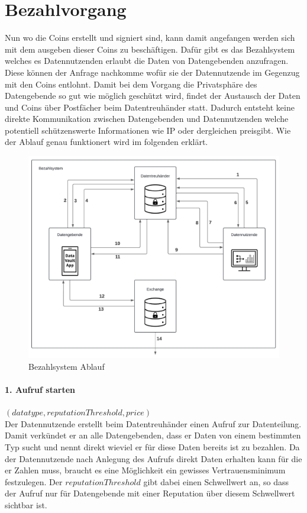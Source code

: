 \documentclass[11pt,a4paper]{scrreprt}
\begin{document}
\section{Bezahlvorgang}
Nun wo die Coins erstellt und signiert sind, kann damit angefangen werden sich mit dem ausgeben dieser Coins zu beschäftigen. Dafür gibt es das Bezahlsystem welches es Datennutzenden erlaubt die Daten von Datengebenden anzufragen. Diese können der Anfrage nachkomme wofür sie der Datennutzende im Gegenzug mit den Coins entlohnt. Damit bei dem Vorgang die Privatsphäre des Datengebende so gut wie möglich geschützt wird, findet der Austausch der Daten und Coins über Postfächer beim Datentreuhänder statt. Dadurch entsteht keine direkte Kommunikation zwischen Datengebenden und Datennutzenden welche potentiell schützenswerte Informationen wie IP oder dergleichen preisgibt. Wie der Ablauf genau funktionert wird im folgenden erklärt.
\begin{figure}[H]
    \centering
    \includegraphics[width=0.9\linewidth]{PaymentDiagramm.pdf}
    \caption{Bezahlsystem Ablauf}
    \label{fig:payment}
\end{figure} 

\paragraph{1. Aufruf starten} $(datatype, reputationThreshold, price)$\\
Der Datennutzende erstellt beim Datentreuhänder einen Aufruf zur Datenteilung. Damit verkündet er an alle Datengebenden, dass er Daten von einem bestimmten Typ sucht und nennt direkt wieviel er für diese Daten bereits ist zu bezahlen. Da der Datennutzende nach Anlegung des Aufrufs direkt Daten erhalten kann für die er Zahlen muss, braucht es eine Möglichkeit ein gewisses Vertrauensminimum festzulegen. Der $reputationThreshold$ gibt dabei einen Schwellwert an, so dass der Aufruf nur für Datengebende mit einer Reputation über diesem Schwellwert sichtbar ist.
\end{document}
